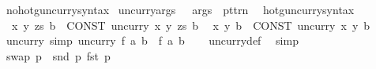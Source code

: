 \begin{isabellebody}
\isamarkupfalse%
\isanewline
{}\isamarkupfalse%
\ no{\isacharunderscore}{\kern0pt}hotg{\isacharunderscore}{\kern0pt}uncurry{\isacharunderscore}{\kern0pt}syntax\isanewline
{}\isanewline
{}\isamarkupfalse%
\ {\isachardoublequoteopen}{\isacharunderscore}{\kern0pt}uncurry{\isacharunderscore}{\kern0pt}args{\isachardoublequoteclose}\ \ {\isacharcolon}{\kern0pt}{\isacharcolon}{\kern0pt}\ {\isachardoublequoteopen}args\ {\isacharequal}{\kern0pt}{\isachargreater}{\kern0pt}\ pttrn{\isachardoublequoteclose}\ {\isacharparenleft}{\kern0pt}{\isachardoublequoteopen}{\isasymlangle}{\isacharunderscore}{\kern0pt}{\isasymrangle}{\isachardoublequoteclose}{\isacharparenright}{\kern0pt}\isanewline
{}\isamarkupfalse%
\isanewline
{}\isamarkupfalse%
\ hotg{\isacharunderscore}{\kern0pt}uncurry{\isacharunderscore}{\kern0pt}syntax\isanewline
\isanewline
{}\isamarkupfalse%
\isanewline
\ \ {\isachardoublequoteopen}{\isasymlambda}{\isasymlangle}x{\isacharcomma}{\kern0pt}\ y{\isacharcomma}{\kern0pt}\ zs{\isasymrangle}{\isachardot}{\kern0pt}\ b{\isachardoublequoteclose}\ {\isasymrightleftharpoons}\ {\isachardoublequoteopen}CONST\ uncurry\ {\isacharparenleft}{\kern0pt}{\isasymlambda}x\ {\isasymlangle}y{\isacharcomma}{\kern0pt}\ zs{\isasymrangle}{\isachardot}{\kern0pt}\ b{\isacharparenright}{\kern0pt}{\isachardoublequoteclose}\isanewline
\ \ {\isachardoublequoteopen}{\isasymlambda}{\isasymlangle}x{\isacharcomma}{\kern0pt}\ y{\isasymrangle}{\isachardot}{\kern0pt}\ b{\isachardoublequoteclose}\ {\isasymrightleftharpoons}\ {\isachardoublequoteopen}CONST\ uncurry\ {\isacharparenleft}{\kern0pt}{\isasymlambda}x\ y{\isachardot}{\kern0pt}\ b{\isacharparenright}{\kern0pt}{\isachardoublequoteclose}\isanewline
\isanewline
{}\isamarkupfalse%
\ uncurry\ {\isacharbrackleft}{\kern0pt}simp{\isacharbrackright}{\kern0pt}{\isacharcolon}{\kern0pt}\ {\isachardoublequoteopen}uncurry\ f\ {\isasymlangle}a{\isacharcomma}{\kern0pt}\ b{\isasymrangle}\ {\isacharequal}{\kern0pt}\ f\ a\ b{\isachardoublequoteclose}\isanewline
%
\isadelimproof
\ \ %
\endisadelimproof
%
\isatagproof
{}\isamarkupfalse%
\ uncurry{\isacharunderscore}{\kern0pt}def\ \isamarkupfalse%
\ simp%
\endisatagproof
{\isafoldproof}%
%
\isadelimproof
\isanewline
%
\endisadelimproof
\isanewline
{}\isamarkupfalse%
\ {\isachardoublequoteopen}swap\ p\ {\isacharequal}{\kern0pt}\ {\isasymlangle}snd\ p{\isacharcomma}{\kern0pt}\ fst\ p{\isasymrangle}{\isachardoublequoteclose}\isanewline

\end{isabellebody}
